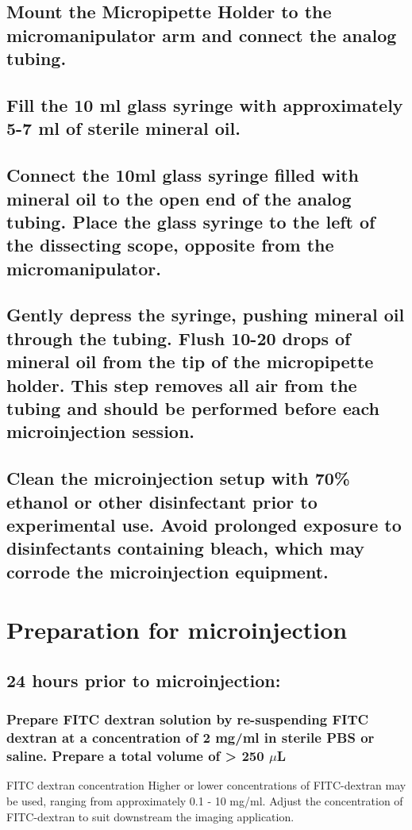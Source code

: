 \documentclass[11pt]{article}
\begin{document}
\subsection{{\sffamily } Mount the Micropipette Holder to the micromanipulator arm and connect the analog tubing.}
\label{sec:orgheadline5}
\subsection{{\sffamily } Fill the 10 ml glass syringe with approximately 5-7 ml of sterile mineral oil.}
\label{sec:orgheadline6}
\subsection{{\sffamily } Connect the 10ml glass syringe filled with mineral oil to the open end of the analog tubing. Place the glass syringe to the left of the dissecting scope, opposite from the micromanipulator.}
\label{sec:orgheadline7}
\subsection{{\sffamily } Gently depress the syringe, pushing mineral oil through the tubing. Flush 10-20 drops of mineral oil from the tip of the micropipette holder. This step removes all air from the tubing and should be performed before each microinjection session.}
\label{sec:orgheadline8}
\subsection{{\sffamily } Clean the microinjection setup with 70\% ethanol or other disinfectant prior to experimental use. Avoid prolonged exposure to disinfectants containing bleach, which may corrode the microinjection equipment.}
\label{sec:orgheadline9}
\section{{\sffamily } Preparation for microinjection}
\label{sec:orgheadline42}

\subsection{{\sffamily } 24 hours prior to microinjection:}
\label{sec:orgheadline13}
\subsubsection{{\sffamily } Prepare FITC dextran solution by re-suspending FITC dextran at a concentration of 2 mg/ml in sterile PBS or saline. Prepare a total volume of > 250 \(\mu\)L}
\label{sec:orgheadline11}
\begin{bclogo}[logo=\bcinfo, couleurBarre=Black, noborder=true, couleur=gray!10]{     FITC dextran concentration}
Higher or lower concentrations of FITC-dextran may be used, ranging from approximately 0.1 - 10 mg/ml. Adjust the concentration of FITC-dextran to suit downstream the imaging application.\\
\end{bclogo}
\end{document}
